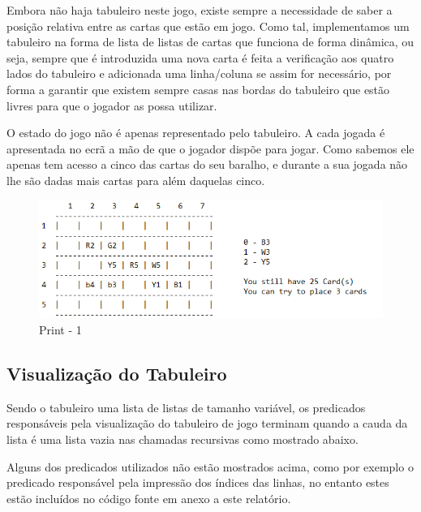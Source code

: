 \documentclass[a4paper]{article}
\begin{document}
	Embora não haja tabuleiro neste jogo, existe sempre a necessidade de saber a posição relativa entre as cartas que estão em jogo. Como tal, implementamos um tabuleiro na forma de lista de listas de cartas que funciona de forma dinâmica, ou seja, sempre que é introduzida uma nova carta é feita a verificação aos quatro lados do tabuleiro e adicionada uma linha/coluna se assim for necessário, por forma a garantir que existem sempre casas nas bordas do tabuleiro que estão livres para que o jogador as possa utilizar.
	
	\lstset{  title=Código - 1}
	
	
O estado do jogo não é apenas representado pelo tabuleiro. A cada jogada é apresentada no ecrã a mão de que o jogador dispõe para jogar. Como sabemos ele apenas tem acesso a cinco das cartas do seu baralho, e durante a sua jogada não lhe são dadas mais cartas para além daquelas cinco.
	
	\lstset{  title=Código - 2}
	

	\begin{figure}[ht!]
	\centering
	\includegraphics[scale = 0.8]{./res/print1.png}
	\caption{Print - 1 \label{Print - 1}}
	\end{figure}

	\subsection{Visualização do Tabuleiro}

	Sendo o tabuleiro uma lista de listas de tamanho variável, os predicados responsáveis pela visualização do tabuleiro de jogo terminam quando a cauda da lista é uma lista vazia nas chamadas recursivas como mostrado abaixo.

	\lstset{  title=Código - 3}
	

	Alguns dos predicados utilizados não estão mostrados acima, como por exemplo o predicado responsável pela impressão dos índices das linhas, no entanto estes estão incluídos no código fonte em anexo a este relatório.
\end{document}
